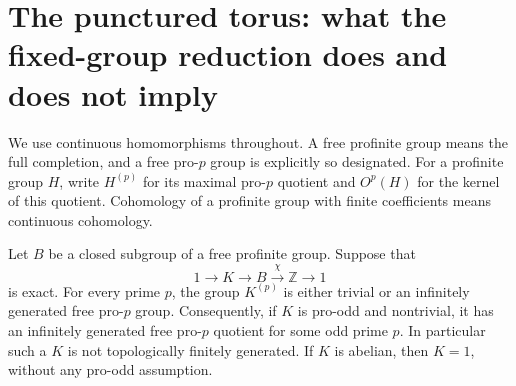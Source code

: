 \section{The punctured torus: what the fixed-group reduction does and does not imply}

We use continuous homomorphisms throughout.  A free profinite group means
the full completion, and a free pro-$p$ group is explicitly so designated.
For a profinite group $H$, write $H^{(p)}$ for its maximal pro-$p$ quotient
and $O^p(H)$ for the kernel of this quotient.  Cohomology of a profinite
group with finite coefficients means continuous cohomology.

Let $B$ be a closed subgroup of a free profinite group.  Suppose that
\[
 1\longrightarrow K\longrightarrow B
       \xrightarrow{\chi}\widehat{\mathbb Z}\longrightarrow1
\]
is exact.  For every prime $p$, the group $K^{(p)}$ is either trivial
or an infinitely generated free pro-$p$ group.  Consequently, if $K$ is
pro-odd and nontrivial, it has an infinitely generated free pro-$p$
quotient for some odd prime $p$.  In particular such a $K$ is not
topologically finitely generated.  If $K$ is abelian, then $K=1$,
without any pro-odd assumption.

